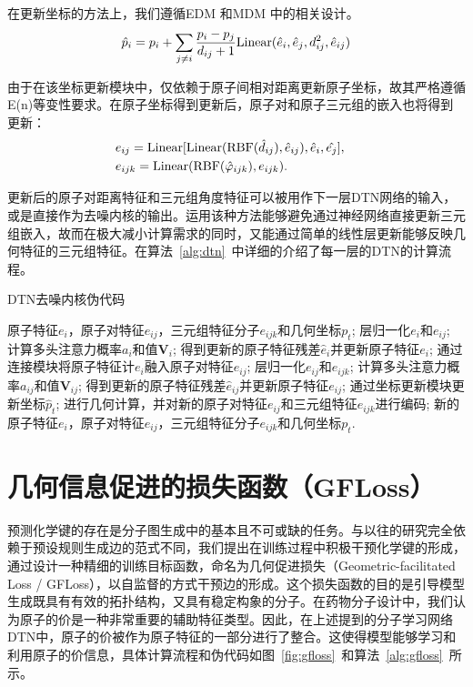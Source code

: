 在更新坐标的方法上，我们遵循EDM \cite{edm_hoogeboom_22}和MDM \cite{mdm_huang_23}中的相关设计。
\begin{equation}
    \hat{p}_i = p_i + \sum_{j \neq i} \frac{p_i - p_j}{d_{ij} + 1} {\rm Linear}(\hat{e}_i, \hat{e}_j, d_{ij}^2, \hat{e}_{ij})
\end{equation}

由于在该坐标更新模块中，仅依赖于原子间相对距离更新原子坐标，故其严格遵循E(n)等变性要求。在原子坐标得到更新后，原子对和原子三元组的嵌入也将得到更新：
\begin{eqnarray}
  &e_{ij} = {\rm Linear}[{\rm Linear}({\rm RBF}(\hat{d}_{ij}), \hat{e}_{ij}), \hat{e}_i, \hat{e_j}],& \\
  &e_{ijk} = {\rm Linear}({\rm RBF}(\hat{\varphi}_{ijk}), e_{ijk}). &
\end{eqnarray}

更新后的原子对距离特征和三元组角度特征可以被用作下一层DTN网络的输入，或是直接作为去噪内核的输出。运用该种方法能够避免通过神经网络直接更新三元组嵌入，故而在极大减小计算需求的同时，又能通过简单的线性层更新能够反映几何特征的三元组特征。在算法~\ref{alg:dtn}~中详细的介绍了每一层的DTN的计算流程。

\begin{algorithm}[H]
    \caption{DTN去噪内核伪代码}
    \label{alg:dtn}
    \begin{algorithmic}
     原子特征$e_i$，原子对特征$e_{ij}$，三元组特征分子$e_{ijk}$和几何坐标$p_t$;
    \STATE 层归一化$e_i$和$e_{ij}$;
    \STATE 计算多头注意力概率$a_i$和值$\mathbf{V}_i$;
    \STATE 得到更新的原子特征残差$\hat{e}_i$并更新原子特征$e_i$;
    \STATE 通过连接模块将原子特征计$e_i$融入原子对特征$e_{ij}$;
    \STATE 层归一化$e_{ij}$和$e_{ijk}$;
    \STATE 计算多头注意力概率$a_{ij}$和值$\mathbf{V}_{ij}$;
    \STATE 得到更新的原子特征残差$\hat{e}_{ij}$并更新原子特征$e_{ij}$;
    \STATE 通过坐标更新模块更新坐标$\hat{p}_t$;
    \STATE 进行几何计算，并对新的原子对特征$e_{ij}$和三元组特征$e_{ijk}$进行编码;
     新的原子特征$e_i$，原子对特征$e_{ij}$，三元组特征分子$e_{ijk}$和几何坐标$p_t$.
    \end{algorithmic}
\end{algorithm}

\section{几何信息促进的损失函数（GFLoss）}
预测化学键的存在是分子图生成中的基本且不可或缺的任务。与以往的研究完全依赖于预设规则生成边的范式不同，我们提出在训练过程中积极干预化学键的形成，通过设计一种精细的训练目标函数，命名为几何促进损失（Geometric-facilitated Loss / GFLoss），以自监督的方式干预边的形成。这个损失函数的目的是引导模型生成既具有有效的拓扑结构，又具有稳定构象的分子。在药物分子设计中，我们认为原子的价是一种非常重要的辅助特征类型。因此，在上述提到的分子学习网络DTN中，原子的价被作为原子特征的一部分进行了整合。这使得模型能够学习和利用原子的价信息，具体计算流程和伪代码如图~\ref{fig:gfloss}~和算法~\ref{alg:gfloss}~所示。

